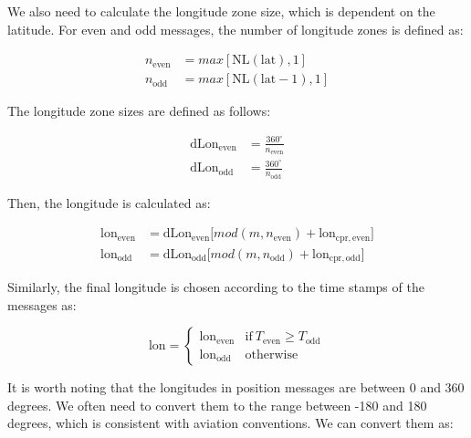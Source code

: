 We also need to calculate the longitude zone size, which is dependent on the latitude. For even and odd messages, the number of longitude zones is defined as:

\begin{equation}
\begin{split}
  n_\mathrm{even} &= max[\mathrm{NL}(\mathrm{lat}), 1] \\
  n_\mathrm{odd} &= max[\mathrm{NL}(\mathrm{lat}-1), 1]
\end{split}
\end{equation}


The longitude zone sizes are defined as follows:

\begin{equation}
\begin{split}
  \mathrm{dLon}_\mathrm{even} &= \frac{360^\circ}{n_\mathrm{even}} \\
  \mathrm{dLon}_\mathrm{odd} &= \frac{360^\circ}{n_\mathrm{odd}}
\end{split}
\end{equation}


Then, the longitude is calculated as:

\begin{equation}
\begin{split}
  \mathrm{lon}_\mathrm{even} &= \mathrm{dLon}_\mathrm{even} \Big[ mod(m, n_\mathrm{even}) + \mathrm{lon}_\mathrm{cpr,even} \Big] \\
  \mathrm{lon}_\mathrm{odd} &= \mathrm{dLon}_\mathrm{odd} \Big[ mod(m, n_\mathrm{odd}) + \mathrm{lon}_\mathrm{cpr,odd} \Big]
  \end{split}
\end{equation}


Similarly, the final longitude is chosen according to the time stamps of the messages as:

\begin{equation}
  \mathrm{lon} =
  \begin{cases}
   \mathrm{lon}_\mathrm{even}     & \text{if}~T_\mathrm{even} \ge T_\mathrm{odd} \\
   \mathrm{lon}_\mathrm{odd}     & \text{otherwise}
  \end{cases}
\end{equation}


It is worth noting that the longitudes in position messages are between 0 and 360 degrees. We often need to convert them to the range between -180 and 180 degrees, which is consistent with aviation conventions. We can convert them as:

